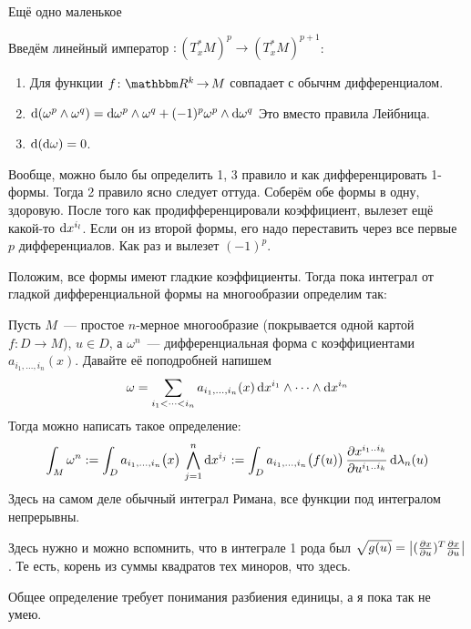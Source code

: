 \documentclass[draft,timbord]{longnotes}
\begin{document}
Ещё одно маленькое 
\begin{defn}\label{defn:dg::secint::extdiff}
  Введём линейный император $\colon (T^*_xM)^p \to (T^*_xM)^{p+1}$:
  \begin{enumerate}
    \item Для функции $f\colon \R^k \to M$ совпадает с обычнм дифференциалом.
    \item $\mathrm{d} (\omega^p \wedge \omega^q )
      = \mathrm{d} \omega ^p \wedge \omega ^q + (-1)^p \omega ^p \wedge \mathrm{d} \omega ^q$
      Это вместо правила Лейбница.
    \item $\mathrm{d} (\mathrm{d} \omega ) = 0$.
  \end{enumerate}
  Вообще, можно было бы определить 1, 3 правило и как дифференцировать 1-формы.
  Тогда 2 правило ясно следует оттуда. Соберём обе формы в одну, здоровую.
  После того как продифференцировали коэффициент, вылезет ещё какой-то $\mathrm{d} x^{i_l}$.
  Если он из второй формы, его надо переставить через все первые $p$ дифференциалов.
  Как раз и вылезет $(-1)^p$.
\end{defn}

\underdev{}

Положим, все формы имеют гладкие коэффициенты.
Тогда пока интеграл от гладкой дифференциальной формы на многообразии определим так:
\begin{defn}\label{defn:dg::secint::difformint}
  Пусть $M$~--- простое $n$-мерное многообразие (покрывается одной картой $f\colon D \to M$),
  $u\in D$,
  а $\omega^n$~--- дифференциальная форма с коэффициентами $a_{i_1, \dotsc, i_n}(x)$.
  Давайте её поподробней напишем
  \[
    \omega =\sum_{i_{1}<\cdots <i_{n}}
    a_{i_1,\dotsc ,i_n} (x) \,\mathrm{d} x^{i_1} \wedge \dotsm \wedge \mathrm{d} x^{i_n}
  \]
  Тогда можно написать такое определение:
  \[ 
    \int_M \omega^n 
    := \int_D a_{i_1,\dotsc ,i_n}\bigl(x\bigr) 
    \, \bigwedge_{j=1}^n \mathrm{d} x^{i_j} 
    := \int_D a_{i_1,\dotsc ,i_n}\bigl(f(u)\bigr) 
    \, \frac{\partial x^{i_1 \mathbin{..} i_k}}{\partial u^{i_1 \mathbin{..} i_k }} \, \mathrm{d} \lambda_n(u) 
  \]
  Здесь на самом деле обычный интеграл Римана, все функции под интегралом непрерывны.
\end{defn}
\begin{rem}\label{rem:dg::secint::noord}
  Здесь нужно и можно вспомнить, что в интеграле 1 рода был 
  $\sqrt{g(u)} = \left|(\frac{\partial x}{\partial u})^T\frac{\partial x}{\partial u}\right|$. Те есть, корень из суммы квадратов
  тех миноров, что здесь.
\end{rem}
Общее определение требует понимания разбиения единицы, а я пока так не умею.
\end{document}
